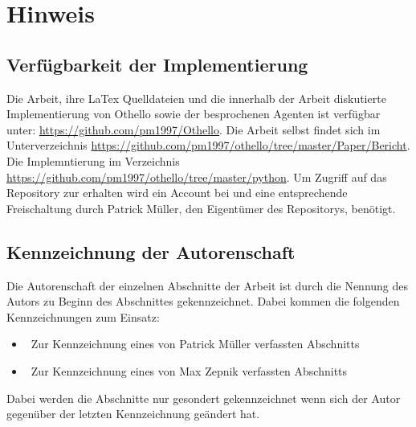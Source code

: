 \chapter*{Hinweis}
\section*{Verfügbarkeit der Implementierung}
Die Arbeit, ihre LaTex Quelldateien und die innerhalb der Arbeit diskutierte Implementierung von Othello sowie der besprochenen Agenten ist verfügbar unter: \href{https://github.com/pm1997/Othello}{https://github.com/pm1997/Othello}. Die Arbeit selbst findet sich im Unterverzeichnis \href{https://github.com/pm1997/othello/tree/master/Paper/Bericht}{https://github.com/pm1997/othello/tree/master/Paper/Bericht}. Die Implemntierung im Verzeichnis \href{https://github.com/pm1997/othello/tree/master/python}{https://github.com/pm1997/othello/tree/master/python}. Um Zugriff auf das Repository zur erhalten wird ein Account bei  und eine entsprechende Freischaltung durch Patrick Müller, den Eigentümer des Repositorys, benötigt.

\section*{Kennzeichnung der Autorenschaft}
Die Autorenschaft der einzelnen Abschnitte der Arbeit ist durch die Nennung des Autors zu Beginn des Abschnittes gekennzeichnet. Dabei kommen die folgenden Kennzeichnungen zum Einsatz:
\begin{itemize}
\item \authorpatrick\ Zur Kennzeichnung eines von Patrick Müller verfassten Abschnitts
\item \authormax\ Zur Kennzeichnung eines von Max Zepnik verfassten Abschnitts
\end{itemize}
Dabei werden die Abschnitte nur gesondert gekennzeichnet wenn sich der Autor gegenüber der letzten Kennzeichnung geändert hat.  